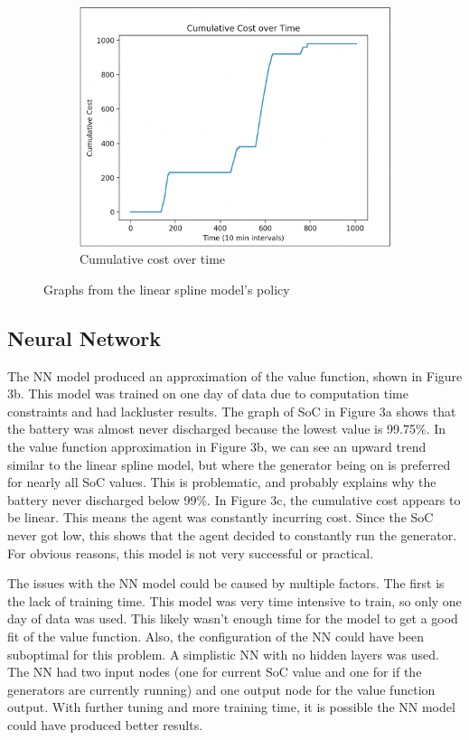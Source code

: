 \documentclass{article}
\begin{document}
\begin{figure}[H]
\begin{subfigure}[b]{0.3\linewidth}
    \includegraphics[width=\linewidth]{pics/lincostvtime.jpg}
    \caption{Cumulative cost over time}
  \end{subfigure}
  \caption{Graphs from the linear spline model's policy}
  \label{fig:linearspline}
\end{figure}

\subsection{Neural Network}

The NN model produced an approximation of the value function, shown in Figure 3b. This model was trained on one day of data due to computation time constraints and had lackluster results. The graph of SoC in Figure 3a shows that the battery was almost never discharged because the lowest value is 99.75\%. In the value function approximation in Figure 3b, we can see an upward trend similar to the linear spline model, but where the generator being on is preferred for nearly all SoC values. This is problematic, and probably explains why the battery never discharged below 99\%. In Figure 3c, the cumulative cost appears to be linear. This means the agent was constantly incurring cost. Since the SoC never got low, this shows that the agent decided to constantly run the generator. For obvious reasons, this model is not very successful or practical.

The issues with the NN model could be caused by multiple factors. The first is the lack of training time. This model was very time intensive to train, so only one day of data was used. This likely wasn't enough time for the model to get a good fit of the value function. Also, the configuration of the NN could have been suboptimal for this problem. A simplistic NN with no hidden layers was used. The NN had two input nodes (one for current SoC value and one for if the generators are currently running) and one output node for the value function output. With further tuning and more training time, it is possible the NN model could have produced better results.
\end{document}
